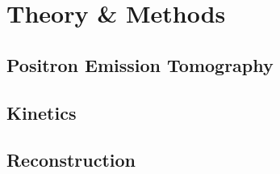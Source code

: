 \chapter{Theory \& Methods}

\section{Positron Emission Tomography}
 

\section{Kinetics}


\section{Reconstruction}

